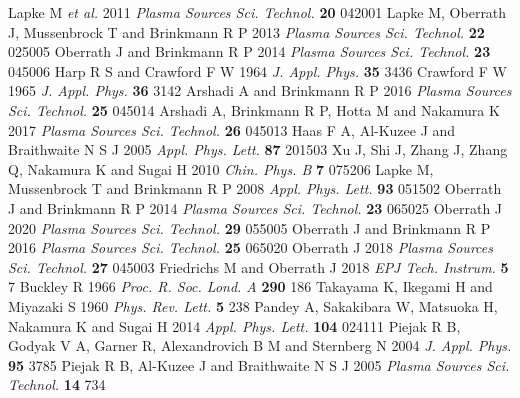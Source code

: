 \documentclass[superscriptaddress,preprint]{revtex4}  %
\renewcommand{\refname}{REFERENCES}
\begin{document}
\renewcommand\refname{\fontsize{11pt}{13pt} \selectfont References \\ \vspace*{-22pt}}
\begin{spacing}{1} 
\begin{thebibliography}{30} %
	Lapke M \textit{et al.} 2011 \textit{Plasma Sources Sci. Technol.} \textbf{20} 042001
	Lapke M, Oberrath J, Mussenbrock T and Brinkmann R P 2013 \textit{Plasma Sources Sci. Technol.} \textbf{22} 025005	
	Oberrath J and Brinkmann R P 2014 \textit{Plasma Sources Sci. Technol.} \textbf{23} 045006	
	Harp R S and Crawford F W 1964 \textit{J. Appl. Phys.} \textbf{35} 3436	
	Crawford F W 1965 \textit{J. Appl. Phys.} \textbf{36} 3142		
	Arshadi A and Brinkmann R P 2016 \textit{Plasma Sources Sci. Technol.} \textbf{25} 045014	
	Arshadi A, Brinkmann R P, Hotta M and Nakamura K 2017 \textit{Plasma Sources Sci. Technol.} \textbf{26} 045013	
	Haas F A, Al-Kuzee J and Braithwaite N S J 2005 \textit{Appl. Phys. Lett.} \textbf{87} 201503
	Xu J, Shi J, Zhang J, Zhang Q, Nakamura K and Sugai H 2010 \textit{Chin. Phys. B} \textbf{7} 075206	
	Lapke M, Mussenbrock T and Brinkmann R P 2008 \textit{Appl. Phys. Lett.} \textbf{93} 051502	
	Oberrath J and Brinkmann R P 2014 \textit{Plasma Sources Sci. Technol.} \textbf{23} 065025
	Oberrath J 2020 \textit{Plasma Sources Sci. Technol.} \textbf{29} 055005 
	Oberrath J and Brinkmann R P 2016 \textit{Plasma Sources Sci. Technol.} \textbf{25} 065020
	Oberrath J 2018 \textit{Plasma Sources Sci. Technol.} \textbf{27} 045003	
	Friedrichs M and Oberrath J 2018 \textit{EPJ Tech. Instrum.}  \textbf{5} 7
	Buckley R 1966 \textit{Proc. R. Soc. Lond. A} \textbf{290} 186
	Takayama K, Ikegami H and Miyazaki S 1960 \textit{Phys. Rev. Lett.} \textbf{5} 238
	Pandey A, Sakakibara W, Matsuoka H, Nakamura K and Sugai H 2014 \textit{Appl. Phys. Lett.} 
	\textbf{104} 024111
	Piejak R B, Godyak V A, Garner R, Alexandrovich B M and Sternberg N 2004 \textit{J. Appl. Phys.} \textbf{95} 3785
	Piejak R B, Al-Kuzee J and Braithwaite N S J 2005 \textit{Plasma Sources Sci. Technol.} \textbf{14} 734	

\end{thebibliography}
\end{spacing}
\end{document}

